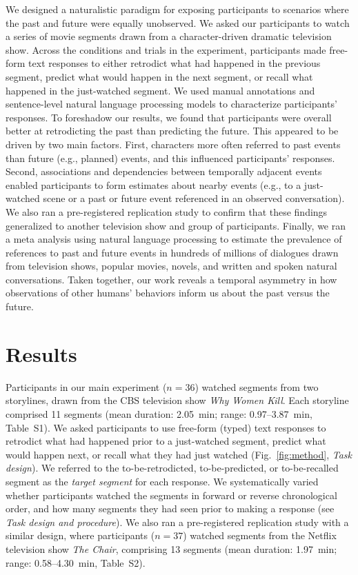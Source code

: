 \documentclass[10pt]{article}
\newcommand{\stimDescription}{S1}
\newcommand{\stimDescriptionRep}{S2}
\begin{document}
We designed a naturalistic paradigm for exposing participants to scenarios where the past and future were equally unobserved. We asked our participants to watch a series of movie segments drawn from a character-driven dramatic television show. Across the conditions and trials in the experiment, participants made free-form text responses to either retrodict what had happened in the previous segment, predict what would happen in the next segment, or recall what happened in the just-watched segment. We used manual annotations and sentence-level natural language processing models to characterize participants' responses. To foreshadow our results, we found that participants were overall better at retrodicting the past than predicting the future. This appeared to be driven by two main factors. First, characters more often referred to past events than future (e.g., planned) events, and this influenced participants' responses. Second, associations and dependencies between temporally adjacent events enabled participants to form estimates about nearby events (e.g., to a just-watched scene or a past or future event referenced in an observed conversation). We also ran a pre-registered replication study to confirm that these findings generalized to another television show and group of participants. Finally, we ran a meta analysis using natural language processing to estimate the prevalence of references to past and future events in hundreds of millions of dialogues drawn from television shows, popular movies, novels, and written and spoken natural conversations. Taken together, our work reveals a temporal asymmetry in how observations of other humans’ behaviors inform us about the past versus the future.

\section*{Results}

Participants in our main experiment ($n = 36$) watched segments from two storylines, drawn from the CBS television show \textit{Why Women Kill}. Each storyline comprised 11 segments (mean duration: 2.05~min; range: 0.97--3.87~min, Table~\stimDescription). We asked participants to use free-form (typed) text responses to retrodict what had happened prior to a just-watched segment, predict what would happen next, or recall what they had just watched (Fig.~\ref{fig:method}, \textit{Task design}). We referred to the to-be-retrodicted, to-be-predicted, or to-be-recalled segment as the \textit{target segment} for each response. We systematically varied whether participants watched the segments in forward or reverse chronological order, and how many segments they had seen prior to making a response (see \textit{Task design and procedure}).  We also ran a pre-registered replication study with a similar design, where participants ($n = 37$) watched segments from the Netflix television show \textit{The Chair}, comprising 13 segments (mean duration: 1.97~min; range: 0.58--4.30~min, Table~\stimDescriptionRep).
\end{document}
